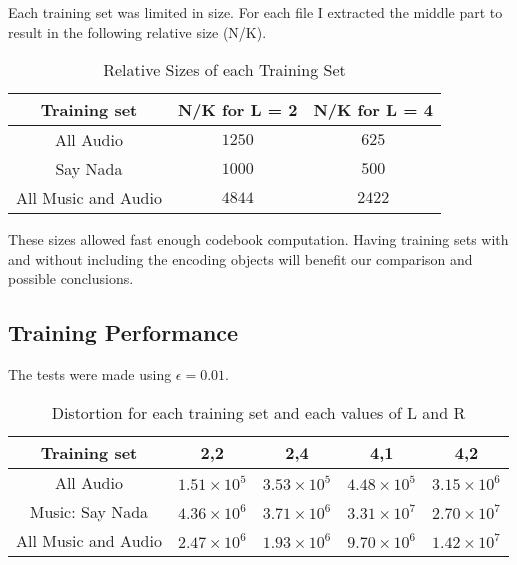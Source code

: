 \documentclass[a4paper, 11pt]{article}
\begin{document}
			Each training set was limited in size. 
			For each file I extracted the middle part to result in the following relative size (N/K).
				
			\begin{table}[H]
				\centering
				\begin{tabular}{c|c|c}
					\textbf{Training set} & \textbf{N/K for L = 2} 	& \textbf{N/K for L = 4} \\ \hline
					All Audio 			& $ 1250 $ 					& $ 625 $	 			 \\ \hline
					Say Nada			& $ 1000 $ 				  	& $ 500 $ \\ \hline	
					All Music and Audio & $ 4844 $					& $	2422 $ \\
				\end{tabular}
				\caption{Relative Sizes of each Training Set}
				\label{table:TrainSets}
			\end{table}
			
			These sizes allowed fast enough codebook computation.
			Having training sets with and without including the encoding objects will benefit our comparison and possible conclusions.
				
		\subsection{Training Performance}
		
			The tests were made using $ \epsilon = 0.01 $.
			\begin{table}[H]
				\centering
				\begin{tabular}{c|c|c|c|c}
					\textbf{Training set} & \textbf{2,2} 			& \textbf{2,4}			&  \textbf{4,1}				& \textbf{4,2} \\ \hline
					All Audio 			& $ 1.51 \times 10^{5} $ 	& $ 3.53 \times 10^{5} $& $4.48 \times 10^{5} $ 	& $ 3.15 \times 10^{6} $ \\ \hline
					Music: Say Nada		& $ 4.36 \times 10^{6} $ 	& $ 3.71 \times 10^{6} $& $ 3.31 \times 10^{7} $  	& $ 2.70 \times 10^{7} $ \\ \hline
					All Music and Audio & $ 2.47 \times 10^{6} $	& $	1.93 \times 10^{6}$	& $ 9.70 \times 10^{6} $	& $	1.42 \times 10^{7} $ \\
				\end{tabular}
				\caption{Distortion for each training set and each values of L and R}
				\label{table:TrainDist}
			\end{table}
			
\end{document}
